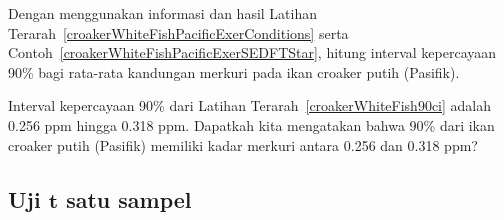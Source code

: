 \begin{exercisewrap}
\begin{nexercise}
\label{croakerWhiteFish90ci}
Dengan menggunakan informasi dan hasil Latihan Terarah~\ref{croakerWhiteFishPacificExerConditions} serta Contoh~\ref{croakerWhiteFishPacificExerSEDFTStar}, hitung interval kepercayaan 90\% bagi rata-rata kandungan merkuri pada ikan croaker putih (Pasifik).\footnotemark{}
\end{nexercise}
\end{exercisewrap}

\begin{exercisewrap}
\begin{nexercise}
Interval kepercayaan 90\% dari
Latihan Terarah~\ref{croakerWhiteFish90ci}
adalah 0.256 ppm hingga 0.318 ppm.
Dapatkah kita mengatakan bahwa 90\% dari ikan croaker putih (Pasifik)
memiliki kadar merkuri antara 0.256 dan 0.318 ppm?\footnotemark{}
\end{nexercise}
\end{exercisewrap}




\subsection[Uji $t$ satu sampel]
    {Uji $\pmb{t}$ satu sampel}
\label{oneSampleTTests}
 
